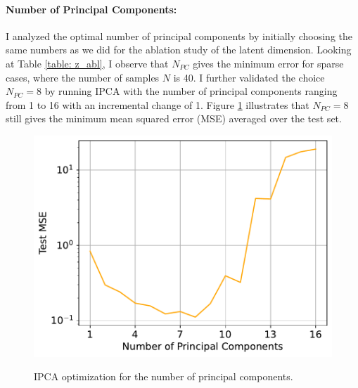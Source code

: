 \paragraph{Number of Principal Components:}
I analyzed the optimal number of principal components by initially choosing the same numbers as we did for the ablation study of the latent dimension. Looking at Table \ref{table: z_abl}, I observe that $N_{PC}$ gives the minimum error for sparse cases, where the number of samples $N$ is 40. I further validated the choice $N_{PC} = 8$ by running IPCA with the number of principal components ranging from 1 to 16 with an incremental change of 1. Figure \ref{fig:ipca_opt} illustrates that $N_{PC} = 8$ still gives the minimum mean squared error (MSE) averaged over the test set.


\begin{figure}[ht]
  \centering

  {\includegraphics[width=0.5\linewidth]{Chapters/hyperbrdf-figs/ipca_opt_q_40_cropped.pdf}}
   \caption{IPCA optimization for the number of principal components.}
   \label{fig:ipca_opt}
\end{figure}

\begin{table}[ht]
    \centering
    \caption{Average mean squared errors for varying latent space dimensions (first row) and number of principal components (second row)}

    \label{table: z_abl}
\end{table}


